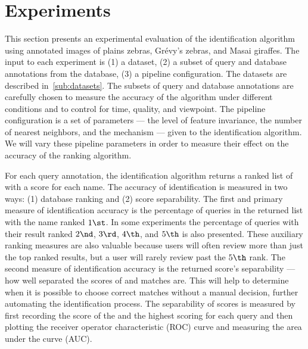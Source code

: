 
\section{Experiments}\label{sec:experiments}

    This section presents an experimental evaluation of the identification algorithm using annotated images of
      plains zebras, Grévy's zebras, and Masai giraffes.
    The input to each experiment is
    (1) a dataset,
    (2) a subset of query and database annotations from the database,
    (3) a pipeline configuration.
    The datasets are described in~\cref{sub:datasets}.
    The subsets of query and database annotations are carefully chosen to measure the accuracy of the algorithm
      under different conditions and to control for time, quality, and viewpoint.
    The pipeline configuration is a set of parameters --- \eg{} the level of feature invariance, the number of
      nearest neighbors, and the \namescoring{} mechanism --- given to the identification algorithm.
    We will vary these pipeline parameters in order to measure their effect on the accuracy of the ranking
      algorithm.

    For each query annotation, the identification algorithm returns a ranked list of \names{} with a score for each
    name. The accuracy of identification is measured in two ways: (1) database ranking and (2) score separability.
    The first and primary measure of identification accuracy is the percentage of queries in the returned list with
    the \groundtrue{} name ranked $1\st$.
    In some experiments the percentage of queries with their \groundtrue{} result ranked $2\nd$, $3\rd$, $4\th$,
    and $5\th$ is also presented. These auxiliary ranking measures are also valuable because users will often
    review more than just the top ranked results, but a user will rarely review past the $5\th$ rank. The second
    measure of identification accuracy is the returned score's separability --- \ie{} how well separated the scores
    of \groundtrue{} and \groundfalse{} matches are. This will help to determine when it is possible to choose
    correct matches without a manual decision, further automating the identification process.
    The separability of scores is measured by first recording the score of the \groundtrue{} \name{} and the
    highest scoring \groundfalse{} \name{} for each query and then plotting the receiver operator characteristic
    (ROC) curve and measuring the area under the curve (AUC).

